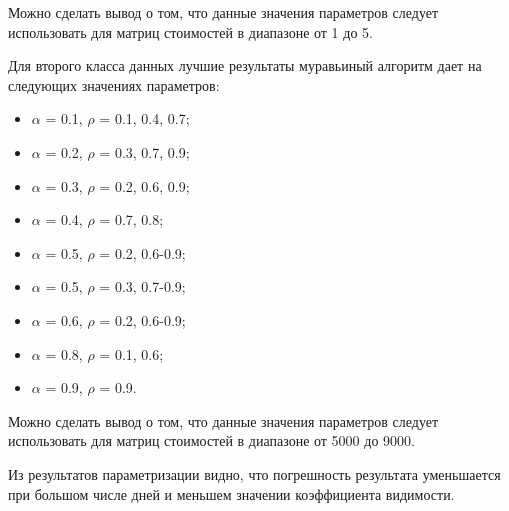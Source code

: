 Можно сделать вывод о том, что данные значения параметров следует использовать для матриц стоимостей в диапазоне от 1 до 5.

Для второго класса данных лучшие результаты муравьиный алгоритм дает на следующих значениях параметров:
\begin{itemize}[label*=---]
	\item $\alpha$ = 0.1, $\rho$ = 0.1, 0.4, 0.7;
	\item $\alpha$ = 0.2, $\rho$ = 0.3, 0.7, 0.9;
	\item $\alpha$ = 0.3, $\rho$ = 0.2, 0.6, 0.9;
	\item $\alpha$ = 0.4, $\rho$ = 0.7, 0.8;
	\item $\alpha$ = 0.5, $\rho$ = 0.2, 0.6-0.9;
	\item $\alpha$ = 0.5, $\rho$ = 0.3, 0.7-0.9;
	\item $\alpha$ = 0.6, $\rho$ = 0.2, 0.6-0.9;
	\item $\alpha$ = 0.8, $\rho$ = 0.1, 0.6;
	\item $\alpha$ = 0.9, $\rho$ = 0.9.
\end{itemize}

Можно сделать вывод о том, что данные значения параметров следует использовать для матриц стоимостей в диапазоне от 5000 до 9000.

Из результатов параметризации видно, что погрешность результата уменьшается при большом числе дней и меньшем значении коэффициента видимости.
